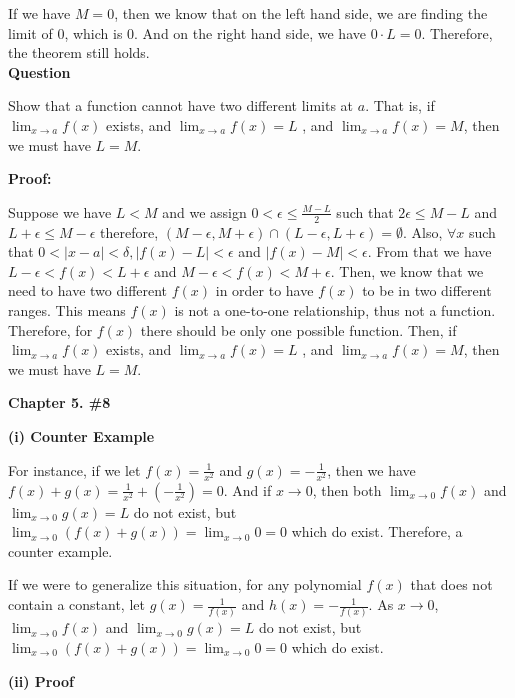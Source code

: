 \documentclass[a4paper,12pt]{report}
\begin{document}
\noindent
If we have $M=0$, then we know that on the left hand side, we are finding the limit of 0, which is 0. And on the right hand side, we have $0\cdot{L}=0$. Therefore, the theorem still holds.\\

\noindent
\textbf{Question}

\noindent
Show that a function cannot
have two different limits at $a$. That is, 
if $\displaystyle{\lim_{x\to a}}f(x)$ exists, and 
$\displaystyle{\lim_{x\to a}}f(x)=L$ , and
$\displaystyle{\lim_{x\to a}}f(x)=M$, then we
must have $L=M$.

\noindent
\textbf{Proof: }

\noindent
Suppose we have $ L < M$ and we assign $0<\epsilon\leq \frac{M-L}{2}$ such that $2\epsilon\leq M-L$ and $L+\epsilon\leq M-\epsilon$ therefore, $(M-\epsilon,M+\epsilon)\cap (L-\epsilon,L+\epsilon)=\emptyset$. Also, $\forall x $ such that $0<|x-a|<\delta, |f(x)-L|< \epsilon$ and $|f(x)-M|< \epsilon$. From that we have $L-\epsilon<f(x)<L+\epsilon$ and $M-\epsilon<f(x)<M+\epsilon$. Then, we know that we need to have two different $f(x)$ in order to have $f(x)$ to be in two different ranges. This means $f(x)$ is not a one-to-one relationship, thus not a function. Therefore, for $f(x)$ there should be only one possible function. Then, if  $\displaystyle{\lim_{x\to a}}f(x)$ exists, and 
$\displaystyle{\lim_{x\to a}}f(x)=L$ , and
$\displaystyle{\lim_{x\to a}}f(x)=M$, then we
must have $L=M$.

\pagebreak
\noindent
\textbf{Chapter 5. \#8}

\noindent
\textbf{(i) Counter Example}

\noindent
For instance, if we let \(f(x)=\frac{1}{x^2}\) and \(g(x)=-\frac{1}{x^2}\), then we have $f(x)+g(x)=\frac{1}{x^2}+(-\frac{1}{x^2})=0$. And if $x\rightarrow 0$, then both $\displaystyle{\lim_{x\to 0}}f(x)$ and $\displaystyle{\lim_{x\to 0}}g(x)=L$ do not exist, but $\displaystyle{\lim_{x\to 0}}(f(x)+g(x))=\displaystyle{\lim_{x\to 0}}0=0$ which do exist. Therefore, a counter example. 

\noindent
If we were to generalize this situation, for any polynomial $f(x)$ that does not contain a constant, let $g(x)=\frac{1}{f(x)}$ and $h(x)=-\frac{1}{f(x)}$. As $x\to 0$,$\displaystyle{\lim_{x\to 0}}f(x)$ and $\displaystyle{\lim_{x\to 0}}g(x)=L$ do not exist, but $\displaystyle{\lim_{x\to 0}}(f(x)+g(x))=\displaystyle{\lim_{x\to 0}}0=0$ which do exist.

\noindent
\textbf{(ii) Proof}
\end{document}
